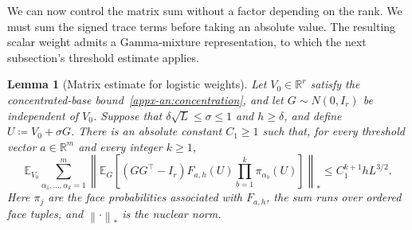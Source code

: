 \documentclass[11pt,letterpaper]{article}
\newtheorem{lemma}{Lemma}
\theoremstyle{remark}
\newcommand{\E}{\mathbb E}
\newcommand{\R}{\mathbb R}
\newcommand{\norm}[1]{\left\lVert#1\right\rVert}
\begin{document}
We can now control the matrix sum without a factor depending on the
rank. We must sum the signed trace terms before taking an absolute value.
The resulting scalar weight admits a Gamma-mixture representation,
to which the next subsection's threshold estimate applies.

\begin{lemma}[Matrix estimate for logistic weights]
\label{appx-an:lem:matrix}
Let \(V_0\in\R^r\) satisfy the concentrated-base
bound~\eqref{appx-an:concentration}, and let \(G\sim N(0,I_r)\) be
independent of \(V_0\). Suppose that
\(\delta\sqrt L\le\sigma\le1\) and \(h\ge\delta\), and {define}
\(U\coloneqq V_0+\sigma G\). There is an absolute constant
\(C_1\ge1\) such that, for every threshold vector \(a\in\R^m\)
and every integer \(k\ge1\),
\begin{equation}
 \E_{V_0}\sum_{\alpha_1,\ldots,\alpha_k=1}^m
 \left\|\E_G\left[(GG^\top-I_r)F_{a,h}(U)
              \prod_{b=1}^k\pi_{\alpha_b}(U)\right]\right\|_*
 \le C_1^{k+1}hL^{3/2}.
 \label{appx-an:matrix-bound}
\end{equation}
Here \(\pi_j\) are the face probabilities associated with
\(F_{a,h}\), the sum runs over ordered face tuples, and
\(\norm{\cdot}_*\) is the nuclear norm.
\end{lemma}
\end{document}
